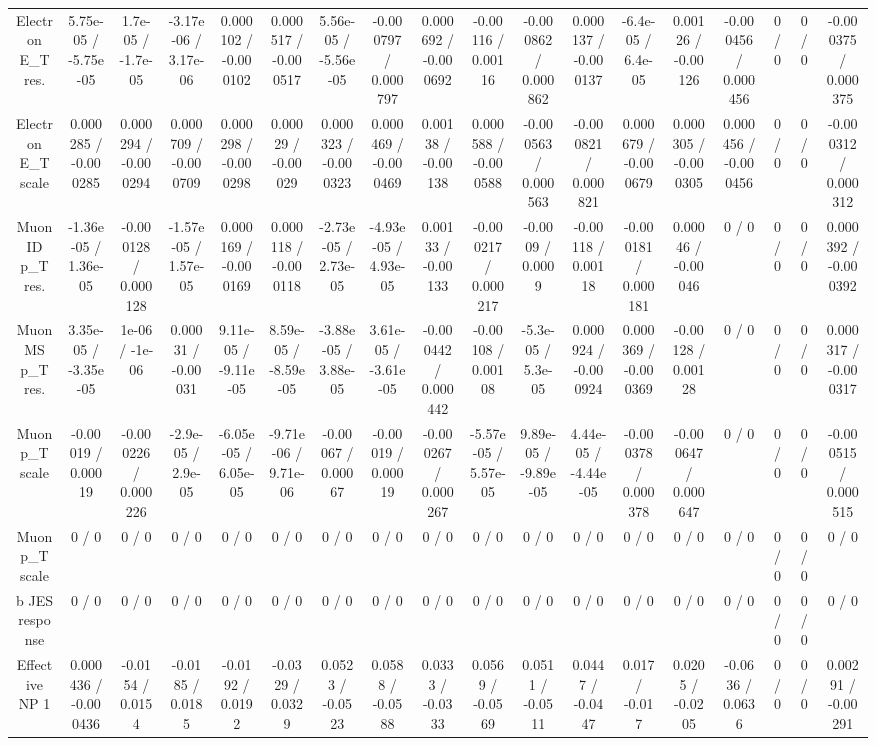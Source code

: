 \documentclass[10pt]{article}
\begin{document}
\begin{table}[htbp]
\begin{center}
\begin{tabular}{|c|c|c|c|c|c|c|c|c|c|c|c|c|c|c|c|c|c|}
  Electron E_{T} res. & 5.75e-05 / -5.75e-05 & 1.7e-05 / -1.7e-05 & -3.17e-06 / 3.17e-06 & 0.000102 / -0.000102 & 0.000517 / -0.000517 & 5.56e-05 / -5.56e-05 & -0.000797 / 0.000797 & 0.000692 / -0.000692 & -0.00116 / 0.00116 & -0.000862 / 0.000862 & 0.000137 / -0.000137 & -6.4e-05 / 6.4e-05 & 0.00126 / -0.00126 & -0.000456 / 0.000456 & 0 / 0 & 0 / 0 & -0.000375 / 0.000375 \\ 
  Electron E_{T} scale & 0.000285 / -0.000285 & 0.000294 / -0.000294 & 0.000709 / -0.000709 & 0.000298 / -0.000298 & 0.00029 / -0.00029 & 0.000323 / -0.000323 & 0.000469 / -0.000469 & 0.00138 / -0.00138 & 0.000588 / -0.000588 & -0.000563 / 0.000563 & -0.000821 / 0.000821 & 0.000679 / -0.000679 & 0.000305 / -0.000305 & 0.000456 / -0.000456 & 0 / 0 & 0 / 0 & -0.000312 / 0.000312 \\ 
  Muon ID p_{T} res. & -1.36e-05 / 1.36e-05 & -0.000128 / 0.000128 & -1.57e-05 / 1.57e-05 & 0.000169 / -0.000169 & 0.000118 / -0.000118 & -2.73e-05 / 2.73e-05 & -4.93e-05 / 4.93e-05 & 0.00133 / -0.00133 & -0.000217 / 0.000217 & -0.0009 / 0.0009 & -0.00118 / 0.00118 & -0.000181 / 0.000181 & 0.00046 / -0.00046 & 0 / 0 & 0 / 0 & 0 / 0 & 0.000392 / -0.000392 \\ 
  Muon MS p_{T} res. & 3.35e-05 / -3.35e-05 & 1e-06 / -1e-06 & 0.00031 / -0.00031 & 9.11e-05 / -9.11e-05 & 8.59e-05 / -8.59e-05 & -3.88e-05 / 3.88e-05 & 3.61e-05 / -3.61e-05 & -0.000442 / 0.000442 & -0.00108 / 0.00108 & -5.3e-05 / 5.3e-05 & 0.000924 / -0.000924 & 0.000369 / -0.000369 & -0.00128 / 0.00128 & 0 / 0 & 0 / 0 & 0 / 0 & 0.000317 / -0.000317 \\ 
  Muon p_{T} scale & -0.00019 / 0.00019 & -0.000226 / 0.000226 & -2.9e-05 / 2.9e-05 & -6.05e-05 / 6.05e-05 & -9.71e-06 / 9.71e-06 & -0.00067 / 0.00067 & -0.00019 / 0.00019 & -0.000267 / 0.000267 & -5.57e-05 / 5.57e-05 & 9.89e-05 / -9.89e-05 & 4.44e-05 / -4.44e-05 & -0.000378 / 0.000378 & -0.000647 / 0.000647 & 0 / 0 & 0 / 0 & 0 / 0 & -0.000515 / 0.000515 \\ 
  Muon p_{T} scale & 0 / 0 & 0 / 0 & 0 / 0 & 0 / 0 & 0 / 0 & 0 / 0 & 0 / 0 & 0 / 0 & 0 / 0 & 0 / 0 & 0 / 0 & 0 / 0 & 0 / 0 & 0 / 0 & 0 / 0 & 0 / 0 & 0 / 0 \\ 
  b JES response & 0 / 0 & 0 / 0 & 0 / 0 & 0 / 0 & 0 / 0 & 0 / 0 & 0 / 0 & 0 / 0 & 0 / 0 & 0 / 0 & 0 / 0 & 0 / 0 & 0 / 0 & 0 / 0 & 0 / 0 & 0 / 0 & 0 / 0 \\ 
  Effective NP 1 & 0.000436 / -0.000436 & -0.0154 / 0.0154 & -0.0185 / 0.0185 & -0.0192 / 0.0192 & -0.0329 / 0.0329 & 0.0523 / -0.0523 & 0.0588 / -0.0588 & 0.0333 / -0.0333 & 0.0569 / -0.0569 & 0.0511 / -0.0511 & 0.0447 / -0.0447 & 0.017 / -0.017 & 0.0205 / -0.0205 & -0.0636 / 0.0636 & 0 / 0 & 0 / 0 & 0.00291 / -0.00291 \\ 

\end{tabular}
\end{center}
\end{table}
\end{document}
